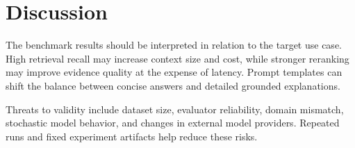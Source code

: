 \section{Discussion}

The benchmark results should be interpreted in relation to the target use case. High retrieval recall may increase context size and cost, while stronger reranking may improve evidence quality at the expense of latency. Prompt templates can shift the balance between concise answers and detailed grounded explanations.

Threats to validity include dataset size, evaluator reliability, domain mismatch, stochastic model behavior, and changes in external model providers. Repeated runs and fixed experiment artifacts help reduce these risks.
